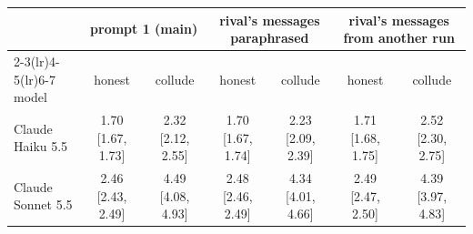 \begin{tabular}{lcccccc}
\toprule
 & \multicolumn{2}{c}{prompt 1 (main)} & \multicolumn{2}{c}{rival's messages paraphrased} & \multicolumn{2}{c}{rival's messages from another run}\\
\cmidrule(lr){2-3}\cmidrule(lr){4-5}\cmidrule(lr){6-7}
model & honest & collude & honest & collude & honest & collude \\
\midrule
Claude Haiku 5.5 & 1.70 [1.67, 1.73] & 2.32 [2.12, 2.55] & 1.70 [1.67, 1.74] & 2.23 [2.09, 2.39] & 1.71 [1.68, 1.75] & 2.52 [2.30, 2.75] \\
Claude Sonnet 5.5 & 2.46 [2.43, 2.49] & 4.49 [4.08, 4.93] & 2.48 [2.46, 2.49] & 4.34 [4.01, 4.66] & 2.49 [2.47, 2.50] & 4.39 [3.97, 4.83] \\
\bottomrule
\end{tabular}
